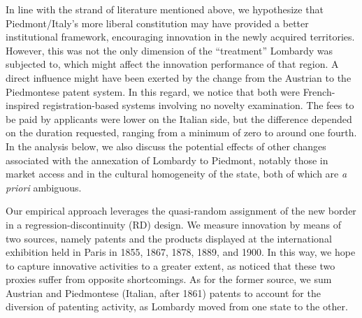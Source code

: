 In line with the strand of literature mentioned above, we hypothesize that Piedmont/Italy's more liberal constitution may have provided a better institutional framework, encouraging innovation in the newly acquired territories. %
However, this was not the only dimension of the ``treatment'' Lombardy was subjected to, which might affect the innovation performance of that region.
A direct influence might have been exerted by the change from the Austrian to the Piedmontese patent system. 
In this regard, we notice that both were French-inspired registration-based systems involving no novelty examination. 
The fees to be paid by applicants were lower on the Italian side, but the difference depended on the duration requested, ranging from a minimum of zero to around one fourth. 
In the analysis below, we also discuss the potential effects of other changes associated with the annexation of Lombardy to Piedmont, notably those in market access and in the cultural homogeneity of the state, both of which are \textit{a priori} ambiguous.


Our empirical approach leverages the quasi-random assignment of the new border in a regression-discontinuity (RD) design. %
We measure innovation by means of two sources, namely patents and the products displayed at the international exhibition held in Paris in 1855, 1867, 1878, 1889, and 1900. %
In this way, we hope to capture innovative activities to a greater extent, as \citet{domini2019} noticed that these two proxies suffer from opposite shortcomings. As for the former source, we sum Austrian and Piedmontese (Italian, after 1861) patents to account for the diversion of patenting activity, as Lombardy moved from one state to the other. %

